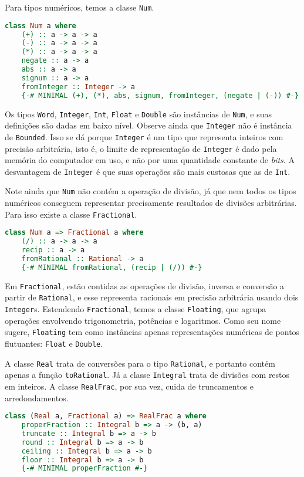 \documentclass[a4paper]{article}
\begin{document}
Para tipos numéricos, temos a classe \texttt{Num}.

\begin{lstlisting}[language=haskell, frame=single]
class Num a where
	(+) :: a -> a -> a
	(-) :: a -> a -> a
	(*) :: a -> a -> a
	negate :: a -> a
	abs :: a -> a
	signum :: a -> a
	fromInteger :: Integer -> a
	{-# MINIMAL (+), (*), abs, signum, fromInteger, (negate | (-)) #-}
\end{lstlisting}

Os tipos \texttt{Word}, \texttt{Integer}, \texttt{Int}, \texttt{Float} e \texttt{Double} são instâncias de \texttt{Num}, e suas definições são dadas em baixo nível.
Observe ainda que \texttt{Integer} não é instância de \texttt{Bounded}.
Isso se dá porque \texttt{Integer} é um tipo que representa inteiros com precisão arbitrária, isto é, o limite de representação de \texttt{Integer} é dado pela memória do computador em uso, e não por uma quantidade constante de \emph{bits}.
A desvantagem de \texttt{Integer} é que suas operações são mais custosas que as de \texttt{Int}.

Note ainda que \texttt{Num} não contém a operação de divisão, já que nem todos os tipos numéricos conseguem representar precisamente resultados de divisões arbitrárias.
Para isso existe a classe \texttt{Fractional}.

\begin{lstlisting}[language=haskell, frame=single]
class Num a => Fractional a where
	(/) :: a -> a -> a
	recip :: a -> a
	fromRational :: Rational -> a
	{-# MINIMAL fromRational, (recip | (/)) #-}
\end{lstlisting}

Em \texttt{Fractional}, estão contidas as operações de divisão, inversa e conversão a partir de \texttt{Rational}, e esse representa racionais em precisão arbitrária usando dois \texttt{Integer}s.
Estendendo \texttt{Fractional}, temos a classe \texttt{Floating}, que agrupa operações envolvendo trigonometria, potências e logaritmos.
Como seu nome sugere, \texttt{Floating} tem como instâncias apenas representações numéricas de pontos flutuantes: \texttt{Float} e \texttt{Double}.

A classe \texttt{Real} trata de conversões para o tipo \texttt{Rational}, e portanto contém apenas a função \texttt{toRational}.
Já a classe \texttt{Integral} trata de divisões com restos em inteiros.
A classe \texttt{RealFrac}, por sua vez, cuida de truncamentos e arredondamentos.

\begin{lstlisting}[language=haskell, frame=single]
class (Real a, Fractional a) => RealFrac a where
	properFraction :: Integral b => a -> (b, a)
	truncate :: Integral b => a -> b
	round :: Integral b => a -> b
	ceiling :: Integral b => a -> b
	floor :: Integral b => a -> b
	{-# MINIMAL properFraction #-}
\end{lstlisting}
\end{document}
